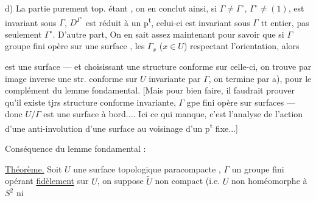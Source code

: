  d) La partie purement top. étant   , on en conclut ainsi, si $\Gamma\ne\Gamma^\circ$, $\Gamma^\circ\ne(1)$,     est invariant sous $\Gamma$,   $D^{\Gamma^\circ}$ est réduit à un p\textsuperscript{t}, celui-ci est invariant sous $\Gamma$ tt entier, pas seulement $\Gamma^\circ$. D'autre part, On en sait assez maintenant pour savoir que si $\Gamma$ groupe fini opère sur une surface  , les $\Gamma_x$ ($x\in U$) respectant l'orientation, alors 



est une surface ---  et choisissant une structure conforme sur celle-ci, on trouve par image inverse une str. conforme sur $U$ invariante par $\Gamma$,   on termine par a),  pour le complément du lemme fondamental. [Mais pour bien faire, il faudrait prouver qu'il existe tjrs structure conforme invariante,  $\Gamma$ gpe fini opère sur surfaces   --- donc $U/\Gamma$ est une surface à bord.... Ici ce qui manque, c'est l'analyse de l'action d'une anti-involution d'une surface au voisinage d'un p\textsuperscript{t} fixe...]


Conséquence du lemme fondamental :

\uline{Théorème.} Soit $U$ une surface topologique paracompacte , $\Gamma$ un groupe fini opérant \uline{fidèlement} sur $U$, on suppose $\widetilde U$  non compact (i.e. $U$ non homéomorphe à $S^2$ ni




